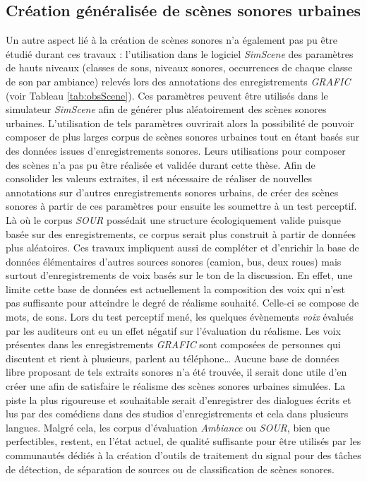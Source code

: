 \subsection*{Création généralisée de scènes sonores urbaines}
Un autre aspect lié à la création de scènes sonores n'a également pas pu être étudié durant ces travaux :  l'utilisation dans le logiciel \textit{SimScene} des paramètres de hauts niveaux (classes de sons, niveaux sonores, occurrences de chaque classe de son par ambiance) relevés lors des annotations des enregistrements \textit{GRAFIC} (voir Tableau \ref{tab:obsScene}).
Ces paramètres peuvent être utilisés dans le simulateur \textit{SimScene} afin de générer plus aléatoirement des scènes sonores urbaines. L'utilisation de tels paramètres ouvrirait alors la possibilité de pouvoir composer de plus larges corpus de scènes sonores urbaines tout en étant basés sur des données issues d'enregistrements sonores. Leurs utilisations pour composer des scènes n'a pas pu être réalisée et validée durant cette thèse. Afin de consolider les valeurs extraites, il est nécessaire de réaliser de nouvelles annotations sur d'autres enregistrements sonores urbains, de créer des scènes sonores à partir de ces paramètres pour ensuite les soumettre à un test perceptif. Là où le corpus \textit{SOUR} possédait une structure écologiquement valide puisque basée sur des enregistrements, ce corpus serait plus construit à partir de données plus aléatoires.
Ces travaux impliquent aussi de compléter et d'enrichir la base de données élémentaires d'autres sources sonores (camion, bus, deux roues) mais surtout d'enregistrements de voix basés sur le ton de la discussion. En effet, une limite cette base de données est actuellement la composition des voix qui n'est pas suffisante pour atteindre le degré de réalisme souhaité. Celle-ci se compose de mots, de sons. Lors du test perceptif mené, les quelques évènements \textit{voix} évalués par les auditeurs ont eu un effet négatif sur l'évaluation du réalisme. Les voix présentes dans les enregistrements \textit{GRAFIC} sont composées de personnes qui discutent et rient à plusieurs, parlent au téléphone\dots{}
Aucune base de données libre proposant de tels extraits sonores n'a été trouvée, il serait donc utile d'en créer une afin de satisfaire le réalisme des scènes sonores urbaines simulées. La piste la plus rigoureuse et souhaitable serait d'enregistrer des dialogues écrits et lus par des comédiens dans des studios d'enregistrements et cela dans plusieurs langues. Malgré cela, les corpus d'évaluation \textit{Ambiance} ou \textit{SOUR}, bien que perfectibles, restent, en l'état actuel, de qualité suffisante pour être utilisés par les communautés dédiés à la création d'outils de traitement du signal pour des tâches de détection, de séparation de sources ou de classification de scènes sonores.

